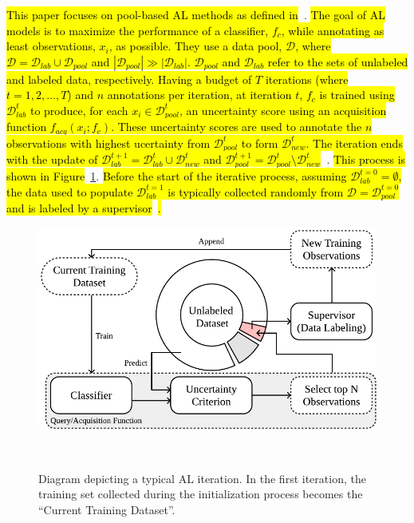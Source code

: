 \documentclass[preprint, 12pt]{elsarticle}
\begin{document}
\hl{This paper focuses on pool-based AL methods as defined
in}~\cite{katz2021improved}. \hl{The goal of AL models is to maximize the
performance of a classifier, $f_{c}$, while annotating as least
observations, $x_i$, as possible. They use a data pool, $\mathcal{D}$, where
$\mathcal{D} = \mathcal{D}_{lab} \cup \mathcal{D}_{pool}$ and
$|\mathcal{D}_{pool}| \gg |\mathcal{D}_{lab}|$. $\mathcal{D}_{pool}$ and
$\mathcal{D}_{lab}$ refer to the sets of unlabeled and labeled data,
respectively. Having a budget of $T$ iterations (where $t = 1, 2, \ldots, T$)
and $n$ annotations per iteration, at iteration $t$, $f_c$ is trained using
$\mathcal{D}_{lab}^t$ to produce, for each $x_i \in \mathcal{D}_{pool}^t$, an
uncertainty score using an acquisition function $f_{acq}(x_i;f_c)$. These
uncertainty scores are used to annotate the $n$
observations with highest ucertainty from $\mathcal{D}_{pool}^t$ to form
$\mathcal{D}_{new}^t$. The iteration ends with the update of
$\mathcal{D}_{lab}^{t+1} = \mathcal{D}_{lab}^t \cup \mathcal{D}_{new}^t$ and
$\mathcal{D}_{pool}^{t+1} = \mathcal{D}_{pool}^t \setminus
\mathcal{D}_{new}^t$}~\cite{Su2020, Sverchkov2017}. \hl{This
process is shown in Figure}~\ref{fig:al_iteration}. \hl{Before the start of
the iterative process, assuming $\mathcal{D}_{lab}^{t=0} = \emptyset$, the
data used to populate $\mathcal{D}_{lab}^{t=1}$ is typically collected
randomly from $\mathcal{D} = \mathcal{D}_{pool}^{t=0}$ and is labeled by a
supervisor}~\cite{Fonseca2021, Yoo2019, Aghdam2019}\hl{.} 

\begin{figure}
	\centering
	\includegraphics[width=.75\linewidth]{../analysis/al_iteration}
    \caption{%
        Diagram depicting a typical AL iteration. In the first iteration, the
        training set collected during the initialization process becomes the
        ``Current Training Dataset''.
    }~\label{fig:al_iteration}
\end{figure}
\end{document}
